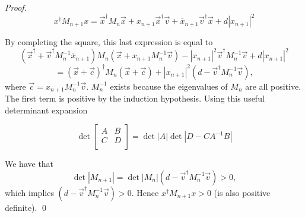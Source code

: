 \begin{proof}
\[ x^\dagger M_{n+1} x = \vec{x}^\dagger M_n \vec{x} + x_{n+1} \vec{x}^\dagger \vec{v} + \overline{x}_{n+1} \vec{v}^\dagger \vec{x} + d |x_{n+1}|^2 \]

By completing the square, this last expression is equal to 
\[ (\vec{x}^\dagger + \vec{v}^\dagger M_n^{-1} \overline{x}_{n+1}) M_n (\vec{x} +  x_{n+1}M_n^{-1} \vec{v} ) - |x_{n+1}|^2  \vec{v}^\dagger M_n^{-1} \vec{v} + d|x_{n+1}|^2 \]
\[ = (\vec{x} + \vec{c})^\dagger M_n (\vec{x} + \vec{c}) + |x_{n+1}|^2 (d - \vec{v}^\dagger M_n^{-1} \vec{v}), \] where $\vec{c} = x_{n+1} M_n^{-1}\vec{v}$. $M_n^{-1}$ exists because
the eigenvalues of $M_n$ are all positive. The first term is positive by the induction hypothesis.  Using this useful determinant expansion

\[ \det{ \begin{bmatrix}
A & B  \\
C & D \\
\end{bmatrix}} = \det{|A|} \det{ | D - C A^{-1}B | } \]

We have that 
\[ \det{|M_{n+1}|} = \det{|M_n|}(d - \vec{v}^\dagger M_n^{-1} \vec{v} )> 0,\]
which implies $(d - \vec{v}^\dagger M_n^{-1} \vec{v}) > 0$. 
Hence $x^\dagger M_{n+1} x > 0$ (is also positive definite). 
\qed
\end{proof}
